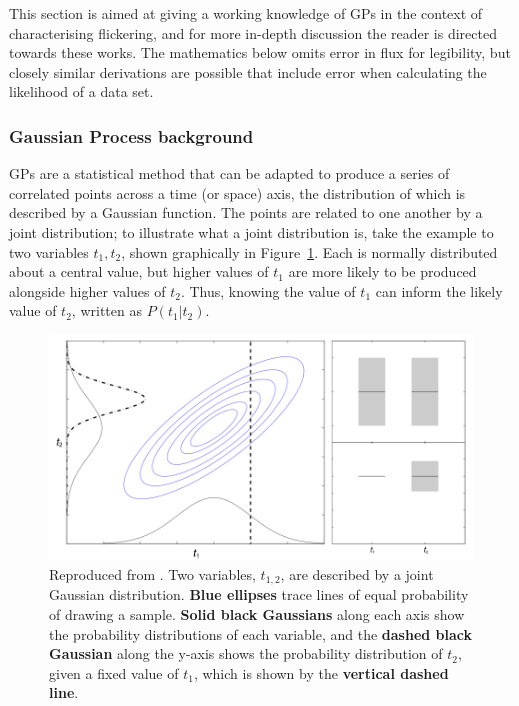 This section is aimed at giving a working knowledge of GPs in the context of characterising flickering, and for more in-depth discussion the reader is directed towards these works. The mathematics below omits error in flux for legibility, but closely similar derivations are possible that include error when calculating the likelihood of a data set.

\subsubsection{Gaussian Process background}
\label{sect:modelling:GP background}

GPs are a statistical method that can be adapted to produce a series of correlated points across a time (or space) axis, the distribution of which is described by a Gaussian function. The points are related to one another by a joint distribution; to illustrate what a joint distribution is, take the example to two variables $t_1, t_2$, shown graphically in Figure~\ref{fig:modelling:joint distribution}. Each is normally distributed about a central value, but higher values of $t_1$ are more likely to be produced alongside higher values of $t_2$. Thus, knowing the value of $t_1$ can inform the likely value of $t_2$, written as $P(t_1 | t_2)$.

\begin{figure}
    \centering
    \includegraphics[width=.8\textwidth, clip, trim={0 0 8.5cm 0}]{figures/modelling/joint_distribution.png}
    \caption{Reproduced from \citet{McallisterThesis}. Two variables, $t_{1,2}$, are described by a joint Gaussian distribution. {\bf Blue ellipses} trace lines of equal probability of drawing a sample. {\bf Solid black Gaussians} along each axis show the probability distributions of each variable, and the {\bf dashed black Gaussian} along the y-axis shows the probability distribution of $t_2$, given a fixed value of $t_1$, which is shown by the {\bf vertical dashed line}.}
    \label{fig:modelling:joint distribution}
\end{figure}

